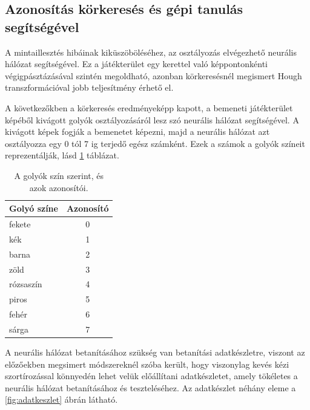 \subsection{Azonosítás körkeresés és gépi tanulás segítségével}
A mintaillesztés hibáinak kiküszöböléséhez, az osztályozás elvégezhető neurális hálózat segítségével. Ez a játékterület egy kerettel való képpontonkénti végigpásztázásával szintén megoldható, azonban körkeresésnél megismert Hough transzformációval jobb teljesítmény érhető el.

\par A következőkben a körkeresés eredményeképp kapott, a bemeneti játékterület képéből kivágott golyók osztályozásáról lesz szó neurális hálózat segítségével. A kivágott képek fogják a bemenetet képezni, majd a neurális hálózat azt osztályozza egy 0 tól 7 ig terjedő egész számként. Ezek a számok a golyók színeit reprezentálják, lásd \ref{tab:golyo_azonositok} táblázat.

\begin{table}[!ht]
    \caption{A golyók szín szerint, és azok azonosítói.}
    \label{tab:golyo_azonositok}
	\footnotesize
	\centering
	\begin{tabular}{ l c }
		\toprule
		Golyó színe & Azonosító \\
		\midrule
		fekete      & 0\\
        kék         & 1\\
        barna       & 2\\
        zöld        & 3\\
        rózsaszín   & 4\\
        piros       & 5\\
        fehér       & 6\\
        sárga       & 7\\
		\bottomrule
	\end{tabular}
\end{table}

\par A neurális hálózat betanításához szükség van betanítási adatkészletre, viszont az előzőekben megsimert módszereknél szóba került, hogy viszonylag kevés kézi szortírozással könnyedén lehet velük előállítani adatkészletet, amely tökéletes a neurális hálózat betanításához és teszteléséhez. Az adatkészlet néhány eleme a \ref{fig:adatkeszlet} ábrán látható.

